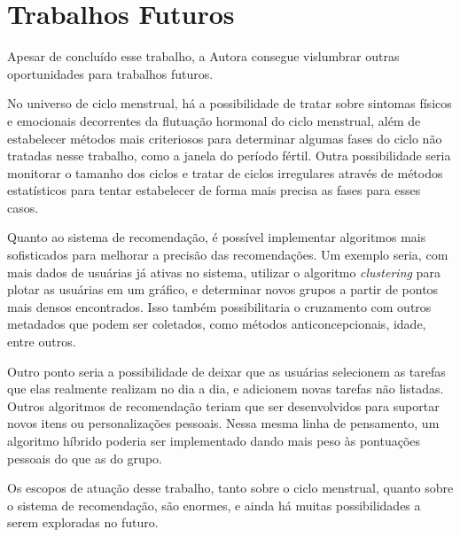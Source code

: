 \section{Trabalhos Futuros}

Apesar de concluído esse trabalho, a Autora consegue vislumbrar outras oportunidades para trabalhos futuros.

No universo de ciclo menstrual, há a possibilidade de tratar sobre sintomas físicos e emocionais decorrentes 
da flutuação hormonal do ciclo menstrual, além de estabelecer métodos mais criteriosos para determinar 
algumas fases do ciclo não tratadas nesse trabalho, como a janela do período fértil. Outra possibilidade seria 
monitorar o tamanho dos ciclos e tratar de ciclos irregulares através de métodos estatísticos para 
tentar estabelecer de forma mais precisa as fases para esses casos.

Quanto ao sistema de recomendação, é possível implementar algoritmos mais sofisticados para melhorar 
a precisão das recomendações. Um exemplo seria, com mais dados de usuárias já ativas no sistema, 
utilizar o algoritmo \emph{clustering} para plotar as usuárias em um gráfico, e determinar 
novos grupos a partir de pontos mais densos encontrados. Isso também possibilitaria o cruzamento com outros 
metadados que podem ser coletados, como métodos anticoncepcionais, idade, entre outros.

Outro ponto seria a possibilidade de deixar que as usuárias selecionem as tarefas que elas realmente 
realizam no dia a dia, e adicionem novas tarefas não listadas. Outros algoritmos de recomendação teriam 
que ser desenvolvidos para suportar novos itens ou personalizações pessoais. Nessa mesma linha de pensamento, 
um algoritmo híbrido poderia ser implementado dando mais peso às pontuações pessoais do que as do grupo.

Os escopos de atuação desse trabalho, tanto sobre o ciclo menstrual, quanto sobre o sistema de recomendação, 
são enormes, e ainda há muitas possibilidades a serem exploradas no futuro.
